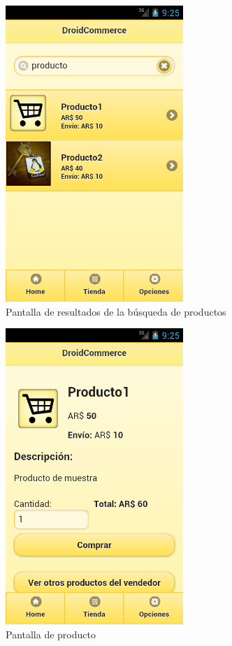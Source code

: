 \begin{figure}
  \centering
    \includegraphics[width=0.6\textwidth]{imagenes/capturas/busqueda.png}
        \caption{Pantalla de resultados de la búsqueda de productos}
    \label{fig:busqueda}
\end{figure}

\begin{figure}
  \centering
    \includegraphics[width=0.6\textwidth]{imagenes/capturas/pagina-producto.png}
        \caption{Pantalla de producto}
    \label{fig:producto}
\end{figure}

